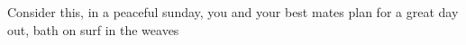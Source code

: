 Consider this, in a peaceful sunday, you and your best mates plan for a great day out, bath on surf in the weaves  